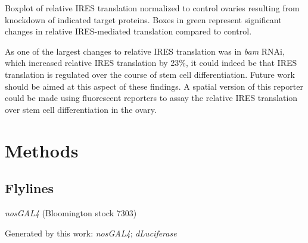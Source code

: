 \documentclass[12pt,oneside]{reedthesis}
\begin{document}
\setlength\parindent{0pt}Boxplot of relative IRES translation normalized to control ovaries resulting from knockdown of indicated target proteins. Boxes in green represent significant changes in relative IRES-mediated translation compared to control.


As one of the largest changes to relative IRES translation was in \emph{bam}
RNAi, which increased relative IRES translation by 23\%, it could indeed
be that IRES translation is regulated over the course of stem cell
differentiation. Future work should be aimed at this aspect of these
findings. A spatial version of this reporter could be made using
fluorescent reporters to assay the relative IRES translation over stem
cell differentiation in the ovary.

\hypertarget{methods}{%
\section{Methods}\label{methods}}

\hypertarget{flylines}{%
\subsection{Flylines}\label{flylines}}

\emph{nosGAL4} (Bloomington stock 7303)

Generated by this work: \emph{nosGAL4}; \emph{dLuciferase}
\end{document}
